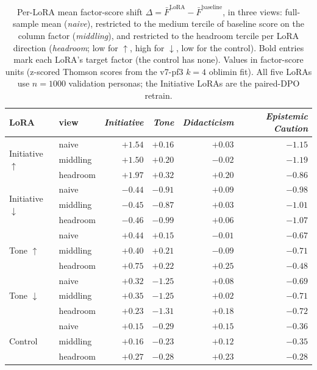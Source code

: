 \begin{table}[htbp]
\centering
\small
\caption{Per-LoRA mean factor-score shift $\Delta = \bar{F}^{\text{LoRA}} - \bar{F}^{\text{baseline}}$, in three views: full-sample mean (\emph{naive}), restricted to the medium tercile of baseline score on the column factor (\emph{middling}), and restricted to the headroom tercile per LoRA direction (\emph{headroom}; low for $\uparrow$, high for $\downarrow$, low for the control). Bold entries mark each LoRA's target factor (the control has none). Values in factor-score units (z-scored Thomson scores from the v7-pf3 $k=4$ oblimin fit). All five LoRAs use $n=1000$ validation personas; the Initiative LoRAs are the paired-DPO retrain.}
\label{tab:4-2-lora-shifts}
\begin{tabular}{l l r r r r}
\toprule
LoRA & view & \textit{Initiative} & \textit{Tone} & \textit{Didacticism} & \textit{Epistemic Caution} \\
\midrule
\multirow{3}{*}{Initiative $\uparrow$}
  & naive    & $\mathbf{+1.54}$ & $+0.16$ & $+0.03$ & $-1.15$ \\
  & middling & $\mathbf{+1.50}$ & $+0.20$ & $-0.02$ & $-1.19$ \\
  & headroom & $\mathbf{+1.97}$ & $+0.32$ & $+0.20$ & $-0.86$ \\
\midrule
\multirow{3}{*}{Initiative $\downarrow$}
  & naive    & $\mathbf{-0.44}$ & $-0.91$ & $+0.09$ & $-0.98$ \\
  & middling & $\mathbf{-0.45}$ & $-0.87$ & $+0.03$ & $-1.01$ \\
  & headroom & $\mathbf{-0.46}$ & $-0.99$ & $+0.06$ & $-1.07$ \\
\midrule
\multirow{3}{*}{Tone $\uparrow$}
  & naive    & $+0.44$ & $\mathbf{+0.15}$ & $-0.01$ & $-0.67$ \\
  & middling & $+0.40$ & $\mathbf{+0.21}$ & $-0.09$ & $-0.71$ \\
  & headroom & $+0.75$ & $\mathbf{+0.22}$ & $+0.25$ & $-0.48$ \\
\midrule
\multirow{3}{*}{Tone $\downarrow$}
  & naive    & $+0.32$ & $\mathbf{-1.25}$ & $+0.08$ & $-0.69$ \\
  & middling & $+0.35$ & $\mathbf{-1.25}$ & $+0.02$ & $-0.71$ \\
  & headroom & $+0.23$ & $\mathbf{-1.31}$ & $+0.18$ & $-0.72$ \\
\midrule
\multirow{3}{*}{Control}
  & naive    & $+0.15$ & $-0.29$ & $+0.15$ & $-0.36$ \\
  & middling & $+0.16$ & $-0.23$ & $+0.12$ & $-0.35$ \\
  & headroom & $+0.27$ & $-0.28$ & $+0.23$ & $-0.28$ \\
\bottomrule
\end{tabular}
\end{table}

